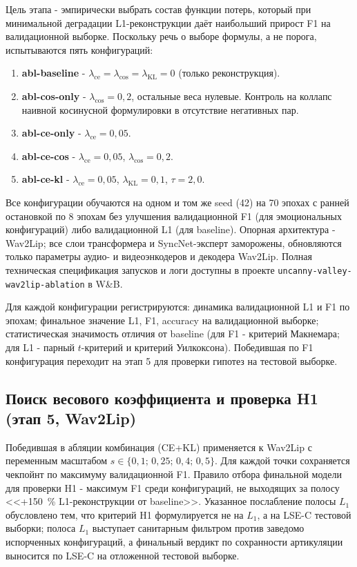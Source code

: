 \documentclass[a4paper, 12pt, oneside, openany]{article}
\begin{document}
Цель этапа - эмпирически выбрать состав функции потерь, который при минимальной деградации L1-реконструкции даёт наибольший прирост F1 на валидационной выборке. Поскольку речь о выборе формулы, а не порога, испытываются пять конфигураций:
\begin{enumerate}
\item \textbf{abl-baseline} - $\lambda_{\text{ce}}=\lambda_{\cos}=\lambda_{\text{KL}}=0$ (только реконструкция).
\item \textbf{abl-cos-only} - $\lambda_{\cos}=0{,}2$, остальные веса нулевые. Контроль на коллапс наивной косинусной формулировки в отсутствие негативных пар.
\item \textbf{abl-ce-only} - $\lambda_{\text{ce}}=0{,}05$.
\item \textbf{abl-ce-cos} - $\lambda_{\text{ce}}=0{,}05$, $\lambda_{\cos}=0{,}2$.
\item \textbf{abl-ce-kl} - $\lambda_{\text{ce}}=0{,}05$, $\lambda_{\text{KL}}=0{,}1$, $\tau=2{,}0$.
\end{enumerate}

Все конфигурации обучаются на одном и том же seed (42) на 70 эпохах с ранней остановкой по 8 эпохам без улучшения валидационной F1 (для эмоциональных конфигураций) либо валидационной L1 (для baseline). Опорная архитектура - Wav2Lip; все слои трансформера и SyncNet-эксперт заморожены, обновляются только параметры аудио- и видеоэнкодеров и декодера Wav2Lip. Полная техническая спецификация запусков и логи доступны в проекте \texttt{uncanny-valley-wav2lip-ablation} в W\&B.

Для каждой конфигурации регистрируются: динамика валидационной L1 и F1 по эпохам; финальное значение L1, F1, accuracy на валидационной выборке; статистическая значимость отличия от baseline (для F1 - критерий Макнемара; для L1 - парный $t$-критерий и критерий Уилкоксона). Победившая по F1 конфигурация переходит на этап 5 для проверки гипотез на тестовой выборке.

\subsection{Поиск весового коэффициента и проверка H1 (этап 5, Wav2Lip)}

Победившая в абляции комбинация (CE+KL) применяется к Wav2Lip с переменным масштабом $s\in\{0{,}1;\,0{,}25;\,0{,}4;\,0{,}5\}$. Для каждой точки сохраняется чекпойнт по максимуму валидационной F1. Правило отбора финальной модели для проверки H1 - максимум F1 среди конфигураций, не выходящих за полосу <<+150~\% L1-реконструкции от baseline>>. Указанное послабление полосы $L_1$ обусловлено тем, что критерий H1 формулируется не на $L_1$, а на LSE-C тестовой выборки; полоса $L_1$ выступает санитарным фильтром против заведомо испорченных конфигураций, а финальный вердикт по сохранности артикуляции выносится по LSE-C на отложенной тестовой выборке.
\end{document}
